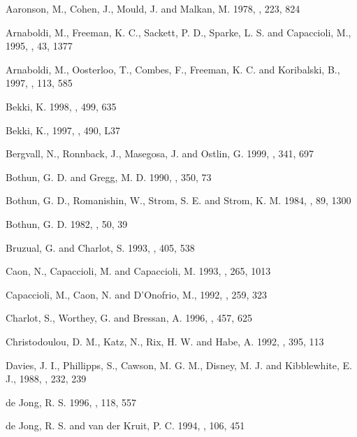 \documentclass{aa}
\begin{document}
\begin{thebibliography}{}
 Aaronson, M., Cohen, J., Mould, J. and Malkan, M. 
1978, \aj, 223, 824  

 Arnaboldi, M., Freeman, K. C., Sackett, P. D., Sparke, L. 
S. and Capaccioli, M., 1995, \pasp, 43, 1377

 Arnaboldi, M., Oosterloo, T., Combes, F., Freeman, K. C. and 
Koribalski, B., 1997, \aj, 113, 585

 Bekki, K. 1998, \apj, 499, 635
      
 Bekki, K., 1997, \apj, 490, L37

 Bergvall, N., Ronnback, J., Masegosa, J. and Ostlin, G. 
1999, \aap, 341, 697                         

 Bothun, G. D. and Gregg, M. D. 1990, \apj, 350, 73
                                                         
 Bothun, G. D., Romanishin, W., Strom, S. E. and Strom, 
K. M. 1984, \aj, 89, 1300  
                                                                          
 Bothun, G. D. 1982, \apjs, 50, 39 

 Bruzual, G. and Charlot, S. 1993, \apj, 405, 538
                                                          
 Caon, N., Capaccioli, M. and Capaccioli, M. 1993, 
\mnras, 265, 1013                                 

 Capaccioli, M., Caon, N. and D'Onofrio, M., 1992, \mnras, 
259, 323                                                     

 Charlot, S., Worthey, G. and Bressan, A. 1996, \apj, 
457, 625                          

 Christodoulou, D. M., Katz, N., Rix, H. W. and 
Habe, A. 1992, \apj, 395, 113                          

 Davies, J. I., Phillipps, S.,
Cawson, M. G. M., Disney, M. J. and Kibblewhite, E. J., 1988, \mnras, 232, 239  
           
 de Jong, R. S. 1996, \aaps, 118, 557   
            
 de Jong, R. S. and van der Kruit, P. C. 1994, \aaps, 
106, 451       


\end{thebibliography}
\end{document}
